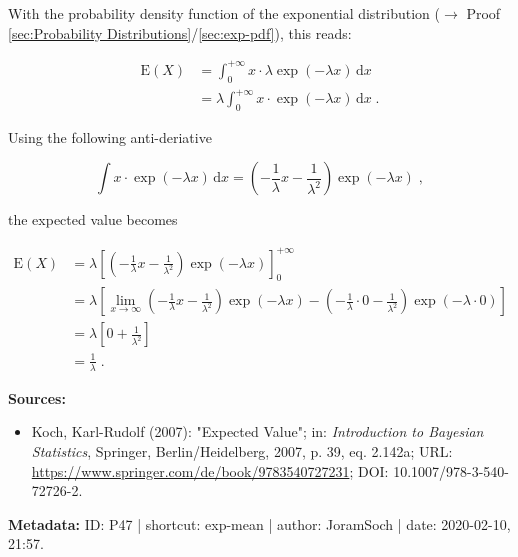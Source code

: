 \documentclass[a4paper,12pt]{book}
\begin{document}
With the probability density function of the exponential distribution ($\rightarrow$ Proof \ref{sec:Probability Distributions}/\ref{sec:exp-pdf}), this reads:

\begin{equation} \label{eq:exp-mean-exp-mean-s1}
\begin{split}
\mathrm{E}(X) &= \int_{0}^{+\infty} x \cdot \lambda \exp(-\lambda x) \, \mathrm{d}x \\
&= \lambda \int_{0}^{+\infty} x \cdot \exp(-\lambda x) \, \mathrm{d}x \; .
\end{split}
\end{equation}

Using the following anti-deriative

\begin{equation} \label{eq:exp-mean-exp-mean-s2}
\int x \cdot \exp(-\lambda x) \, \mathrm{d}x = \left( - \frac{1}{\lambda} x - \frac{1}{\lambda^2} \right) \exp(-\lambda x) \; ,
\end{equation}

the expected value becomes

\begin{equation} \label{eq:exp-mean-exp-mean-s3}
\begin{split}
\mathrm{E}(X) &= \lambda \left[ \left( - \frac{1}{\lambda} x - \frac{1}{\lambda^2} \right) \exp(-\lambda x) \right]_{0}^{+\infty} \\
&= \lambda \left[ \lim_{x \to \infty} \left( - \frac{1}{\lambda} x - \frac{1}{\lambda^2} \right) \exp(-\lambda x) - \left( - \frac{1}{\lambda} \cdot 0 - \frac{1}{\lambda^2} \right) \exp(-\lambda \cdot 0) \right] \\
&= \lambda \left[ 0 + \frac{1}{\lambda^2} \right] \\
&= \frac{1}{\lambda} \; .
\end{split}
\end{equation}

\vspace{1em}
\textbf{Sources:}
\begin{itemize}
\item Koch, Karl-Rudolf (2007): "Expected Value"; in: \textit{Introduction to Bayesian Statistics}, Springer, Berlin/Heidelberg, 2007, p. 39, eq. 2.142a; URL: \url{https://www.springer.com/de/book/9783540727231}; DOI: 10.1007/978-3-540-72726-2.
\end{itemize}


\vspace{1em}
\textbf{Metadata:} ID: P47 | shortcut: exp-mean | author: JoramSoch | date: 2020-02-10, 21:57.
\end{document}
